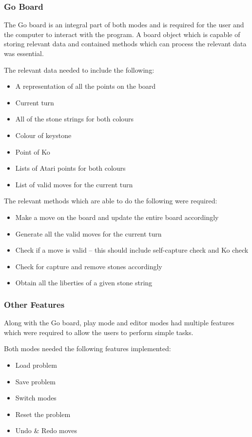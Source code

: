 \documentclass{l4proj}
\begin{document}
\subsubsection{Go Board}
The Go board is an integral part of both modes and is required for the user and the computer to interact with the program. A board object which is capable of storing relevant data and contained methods which can process the relevant data was essential.

The relevant data needed to include the following:
\begin{itemize}
\item A representation of all the points on the board
\item Current turn
\item All of the stone strings for both colours
\item Colour of keystone
\item Point of Ko
\item Lists of Atari points for both colours
\item List of valid moves for the current turn
\end{itemize}

The relevant methods which are able to do the following were required:
\begin{itemize}
\item Make a move on the board and update the entire board accordingly
\item Generate all the valid moves for the current turn
\item Check if a move is valid – this should include self-capture check and Ko check
\item Check for capture and remove stones accordingly
\item Obtain all the liberties of a given stone string
\end{itemize}

\subsubsection{Other Features}
Along with the Go board, play mode and editor modes had multiple features which were required to allow the users to perform simple tasks.

Both modes needed the following features implemented:
\begin{itemize}
\item Load problem
\item Save problem
\item Switch modes
\item Reset the problem
\item Undo \& Redo moves
\end{itemize}
\end{document}
